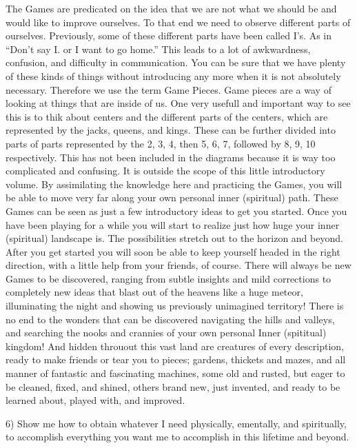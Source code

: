 \documentclass[12pt,letterpaper]{book}
\begin{document}
The Games are predicated on the idea that we are not what we should be and would like to improve ourselves. To that end we need to observe different parts of ourselves. Previously, some of these different parts have been called I's. As in ``Don't say I. or I want to go home.'' This leads to a lot of awkwardness, confusion, and difficulty in communication. You can be sure that we have plenty of these kinds of things without introducing any more when it is not absolutely necessary. Therefore we use the term Game Pieces. Game pieces are a way of looking at things that are inside of us. One very usefull and important way to see this is to thik about centers and the different parts of the centers, which are represented by the jacks, queens, and kings. These can be further divided into parts of parts represented by the 2, 3, 4, then 5, 6, 7, followed by 8, 9, 10 respectively. This has not been included in the diagrams because it is way too complicated and confusing. It is outside the scope of this little introductory volume. By assimilating the knowledge here and practicing the Games, you will be able to move very far along your own personal inner (spiritual) path. 
These Games can be seen as just a few introductory ideas to get you started. Once you have been playing for a while you will start to realize just how huge your inner (spiritual) landscape is. The possibilities stretch out to the horizon and beyond. After you get started you will soon be able to keep yourself headed in the right direction, with a little help from your friends, of course. There will always be new Games to be discovered, ranging from subtle insights and mild corrections to completely new ideas that blast out of the heavens like a huge meteor, illuminating the night and showing us previously unimagined territory! There is no end to the wonders that can be discovered navigating the hills and valleys, and searching the nooks and crannies of your own personal Inner (spititual) kingdom! And hidden throuout this vast land are creatures of every description, ready to make friends or tear you to pieces; gardens, thickets and mazes, and all manner of fantastic and fascinating machines, some old and rusted, but eager to be cleaned, fixed, and shined, others brand new, just invented, and ready to be learned about, played with, and improved.

6) Show me how to obtain whatever I need physically, ementally, and spiritually, to accomplish everything you want me to accomplish in this lifetime and beyond.
\end{document}

